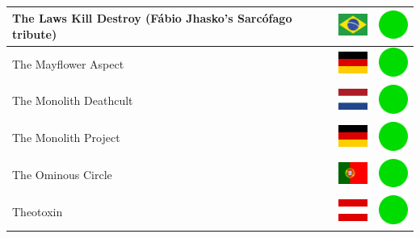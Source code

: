 \documentclass[12pt, a4paper, twoside]{report}
\begin{document}
\begin{center}
\begin{longtable}{|p{5cm}|p{2cm}|p{2cm}|}
 The Laws Kill Destroy (Fábio Jhasko's Sarcófago tribute)   & \includegraphics[width=1cm]{../img/flags/br} &   \includegraphics[width=1cm]{../likes/y} \\ \hline
 The Mayflower Aspect                                       & \includegraphics[width=1cm]{../img/flags/de} &   \includegraphics[width=1cm]{../likes/y} \\ \hline
 The Monolith Deathcult                                     & \includegraphics[width=1cm]{../img/flags/nl} &   \includegraphics[width=1cm]{../likes/y} \\ \hline
 The Monolith Project                                       & \includegraphics[width=1cm]{../img/flags/de} &   \includegraphics[width=1cm]{../likes/y} \\ \hline
 The Ominous Circle                                         & \includegraphics[width=1cm]{../img/flags/pt} &   \includegraphics[width=1cm]{../likes/y} \\ \hline
 Theotoxin                                                  & \includegraphics[width=1cm]{../img/flags/at} &   \includegraphics[width=1cm]{../likes/y} \\ \hline

\end{longtable}
\end{center}
\end{document}
